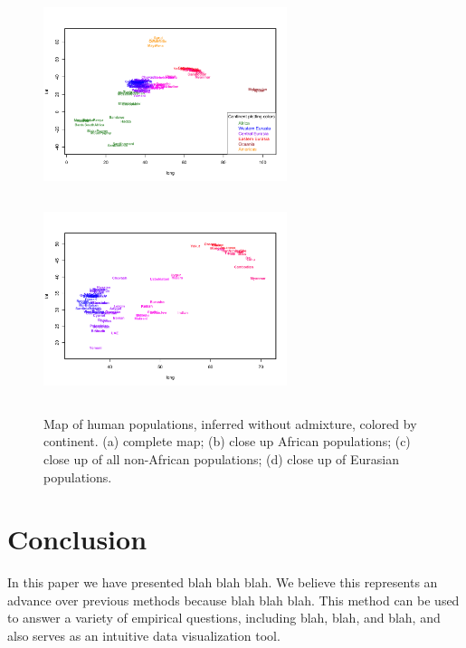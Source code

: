 \documentclass[12pt]{article}
\begin{document}
\begin{figure}
	\centering
			{\includegraphics[width=2.8in,height=2.3in]{figs/globe_NoAd_map.png}}
			{\includegraphics[width=2.8in,height=2.3in]{figs/globe_Eurasia_NoAd_map.png}}

	\caption{Map of human populations, inferred without admixture, colored by continent. (a) complete map;  (b) close up African populations; (c) close up of all non-African populations; (d) close up of Eurasian populations.}\label{sfig:globe_noad_maps}
\end{figure}

\section*{Conclusion}
In this paper we have presented blah blah blah.  We believe this represents an advance over previous methods because blah blah blah.  This method can be used to answer a variety of empirical questions, including blah, blah, and blah, and also serves as an intuitive data visualization tool.
\end{document}
